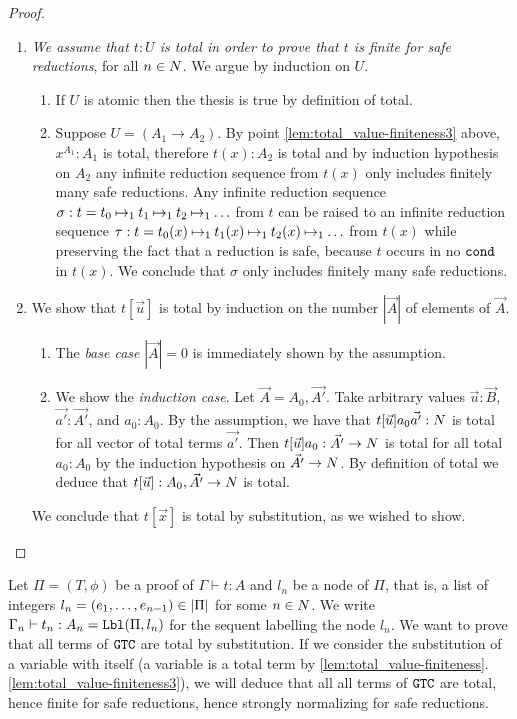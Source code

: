 \begin{proof}
\begin{enumerate}
\item
\emph{We assume that  $t:U$ is total in order to prove that $t$ is finite for safe reductions},
for all $n \in {N}$.
We argue by induction on $U$.
\begin{enumerate}
\item
If $U$ is atomic then the thesis is true by definition of total.
\item
Suppose $U = (A_1 \rightarrow A_2)$. By point \ref{lem:total_value-finiteness3} above,
$x^{A_1}:A_1$ is total, therefore $t(x):A_2$ is total and by induction hypothesis on $A_2$
any infinite reduction sequence from $t(x)$ only includes finitely many safe reductions. 
Any infinite reduction sequence 
$\sigma: t = t_0 \mathbin{\mapsto}_1 t_1 \mathbin{\mapsto}_1 t_2 \mathbin{\mapsto}_1 \ldots$  from $t$ 
can be raised to an infinite reduction sequence 
$\tau: t = t_0(x) \mathbin{\mapsto}_1 t_1(x) \mathbin{\mapsto}_1 t_2(x) \mathbin{\mapsto}_1 \ldots$ from $t(x)$
while preserving the fact that a reduction is safe, because $t$ occurs in no ${\tt cond}$ in $t(x)$.
We conclude that $\sigma$ only includes finitely many safe reductions. 
\end{enumerate}

\item  
We show that $t[\vec{u}]$ is total by induction on the number $|\vec{A}|$ of
elements of $\vec{A}$.
\begin{enumerate}
\item
  The \emph{base case} $|\vec{A}| = 0$ is immediately shown by the assumption.
\item
  We show the \emph{induction case}. Let $\vec{A} = A_0,\vec{A'}$.
  Take arbitrary values $\vec{u}:\vec{B}$, $\vec{a'}:\vec{A'}$, and $a_0:A_0$. 
  By the assumption, we have that $t[\vec{u}]a_0\vec{a'}:{N}$ is total  for all 
  vector of total terms $\vec{a'}$. 
  Then $t[\vec{u}]a_0:\vec{A'}\rightarrow{N}$ is total for all total $a_0:A_0$
  by the induction hypothesis on $\vec{A'}\rightarrow {N}$.
  By definition of total we deduce that $t[\vec{u}] : A_0,\vec{A'}\rightarrow{N}$ is total.
\end{enumerate}
We conclude that $t[\vec{x}]$ is total by substitution, as we wished to show.

\end{enumerate}
\end{proof}


Let $\Pi=(T,\phi)$ be a proof of $\Gamma\vdash t:A$ and $l_n$ be a node of $\Pi$, that is, a list  
of integers $l_n=(e_1, \ldots, e_{n-1}) \in {|\Pi|}$ for some $n \in {N}$.
We write $\Gamma_{n}\vdash t_{n}:A_{n} = {\tt Lbl}(\Pi,l_n)$ for the sequent
 labelling the node $l_n$. We want to prove that all terms of ${\tt GTC}$ are total by substitution.
If we consider the substitution of a variable with itself 
(a variable is a total term by \ref{lem:total_value-finiteness}.\ref{lem:total_value-finiteness3}),
we will deduce that all all terms of ${\tt GTC}$ are total, 
hence finite for safe reductions, hence strongly normalizing for safe reductions.


